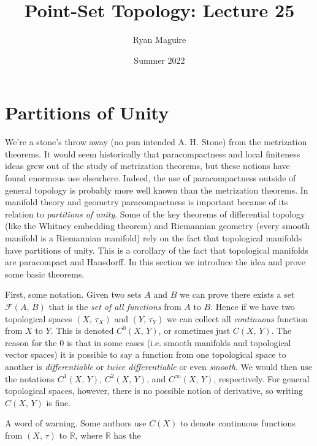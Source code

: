 \documentclass{article}
\title{Point-Set Topology: Lecture 25}
\author{Ryan Maguire}
\date{Summer 2022}
\theoremstyle{plain}
\theoremstyle{normal}
\begin{document}
    \maketitle
    \section{Partitions of Unity}
        We're a stone's throw away (no pun intended A. H. Stone) from the
        metrization theorems. It would seem historically that paracompactness
        and local finiteness ideas grew out of the study of metrization
        theorems, but these notions have found enormous use elsewhere. Indeed,
        the use of paracompactness outside of general topology is probably more
        well known than the metrization theorems. In manifold theory and
        geometry paracompactness is important because of its relation to
        \textit{partitions of unity}. Some of the key theorems of differential
        topology (like the Whitney embedding theorem) and Riemannian geometry
        (every smooth manifold is a Riemannian manifold) rely on the fact that
        topological manifolds have partitions of unity. This is a corollary of
        the fact that topological manifolds are paracompact and Hausdorff. In
        this section we introduce the idea and prove some basic theorems.
        \par\hfill\par
        First, some notation. Given two sets $A$ and $B$ we can prove there
        exists a set $\mathcal{F}(A,\,B)$ that is the
        \textit{set of all functions} from $A$ to $B$. Hence if we have two
        topological spaces $(X,\,\tau_{X})$ and $(Y,\,\tau_{Y})$ we can collect
        all \textit{continuous} function from $X$ to $Y$. This is denoted
        $C^{0}(X,\,Y)$, or sometimes just $C(X,\,Y)$. The reason for the
        $0$ is that in some cases (i.e. smooth manifolds and topological vector
        spaces) it is possible to say a function from one topological space to
        another is \textit{differentiable} or \textit{twice differentiable} or
        even \textit{smooth}. We would then use the notations
        $C^{1}(X,\,Y)$,  $C^{2}(X,\,Y)$, and $C^{\infty}(X,\,Y)$, respectively.
        For general topological spaces, however, there is no possible notion
        of derivative, so writing $C(X,\,Y)$ is fine.
        \par\hfill\par
        A word of warning. Some authors use $C(X)$ to denote continuous
        functions from $(X,\,\tau)$ to $\mathbb{R}$, where $\mathbb{R}$ has the
\end{document}
